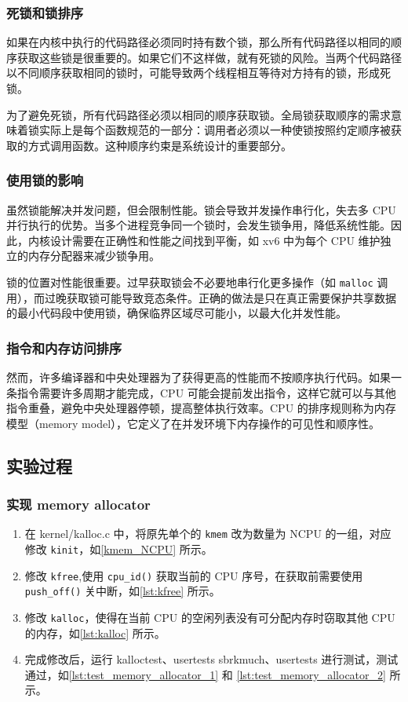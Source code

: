 \subsubsection{死锁和锁排序}

如果在内核中执行的代码路径必须同时持有数个锁，那么所有代码路径以相同的顺序获取这些锁是很重要的。如果它们不这样做，就有死锁的风险。当两个代码路径以不同顺序获取相同的锁时，可能导致两个线程相互等待对方持有的锁，形成死锁。

为了避免死锁，所有代码路径必须以相同的顺序获取锁。全局锁获取顺序的需求意味着锁实际上是每个函数规范的一部分：调用者必须以一种使锁按照约定顺序被获取的方式调用函数。这种顺序约束是系统设计的重要部分。

\subsubsection{使用锁的影响}

虽然锁能解决并发问题，但会限制性能。锁会导致并发操作串行化，失去多 CPU 并行执行的优势。当多个进程竞争同一个锁时，会发生锁争用，降低系统性能。因此，内核设计需要在正确性和性能之间找到平衡，如 xv6 中为每个 CPU 维护独立的内存分配器来减少锁争用。

锁的位置对性能很重要。过早获取锁会不必要地串行化更多操作（如 \texttt{malloc} 调用），而过晚获取锁可能导致竞态条件。正确的做法是只在真正需要保护共享数据的最小代码段中使用锁，确保临界区域尽可能小，以最大化并发性能。

\subsubsection{指令和内存访问排序}

然而，许多编译器和中央处理器为了获得更高的性能而不按顺序执行代码。如果一条指令需要许多周期才能完成，CPU 可能会提前发出指令，这样它就可以与其他指令重叠，避免中央处理器停顿，提高整体执行效率。CPU 的排序规则称为内存模型（memory model），它定义了在并发环境下内存操作的可见性和顺序性。

\subsection{实验过程}

\subsubsection{实现 memory allocator}

\begin{enumerate}
	\item 在 kernel/kalloc.c 中，将原先单个的 \texttt{kmem} 改为数量为 NCPU 的一组，对应修改 \texttt{kinit}，如\cref{kmem_NCPU} 所示。 
	\item 修改 \texttt{kfree},使用 \texttt{cpu\_id()} 获取当前的 CPU 序号，在获取前需要使用 \texttt{push\_off()} 关中断，如\cref{lst:kfree} 所示。
	\item 修改 \texttt{kalloc}，使得在当前 CPU 的空闲列表没有可分配内存时窃取其他 CPU 的内存，如\cref{lst:kalloc} 所示。
	\item 完成修改后，运行 kalloctest、usertests sbrkmuch、usertests 进行测试，测试通过，如\cref{lst:test_memory_allocator_1} 和 \cref{lst:test_memory_allocator_2} 所示。
\end{enumerate}

